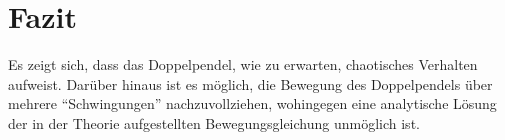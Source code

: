 \section{Fazit}
Es zeigt sich, dass das Doppelpendel, wie zu erwarten, chaotisches Verhalten aufweist. Darüber hinaus ist es möglich, die Bewegung des Doppelpendels über mehrere \enquote{Schwingungen} nachzuvollziehen, wohingegen eine analytische Lösung der in der Theorie aufgestellten Bewegungsgleichung unmöglich ist. 
